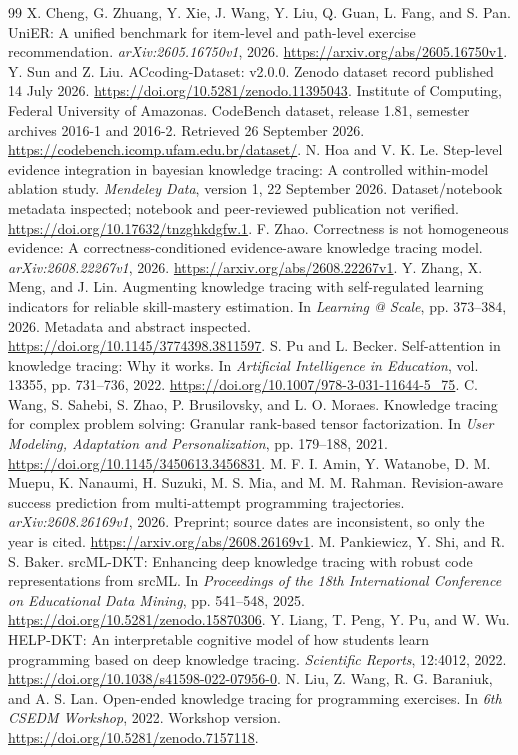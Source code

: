 \documentclass[11pt]{article}
\newcommand{\1}{\mathbb{I}}
\begin{document}
\begin{thebibliography}{99}
 X. Cheng, G. Zhuang, Y. Xie, J. Wang, Y. Liu, Q. Guan, L. Fang, and S. Pan. UniER: A unified benchmark for item-level and path-level exercise recommendation. \emph{arXiv:2605.16750v1}, 2026. \url{https://arxiv.org/abs/2605.16750v1}.
 Y. Sun and Z. Liu. ACcoding-Dataset: v2.0.0. Zenodo dataset record published 14 July 2026. \url{https://doi.org/10.5281/zenodo.11395043}.
 Institute of Computing, Federal University of Amazonas. CodeBench dataset, release 1.81, semester archives 2016-1 and 2016-2. Retrieved 26 September 2026. \url{https://codebench.icomp.ufam.edu.br/dataset/}.
 N. Hoa and V. K. Le. Step-level evidence integration in bayesian knowledge tracing: A controlled within-model ablation study. \emph{Mendeley Data}, version 1, 22 September 2026. Dataset/notebook metadata inspected; notebook and peer-reviewed publication not verified. \url{https://doi.org/10.17632/tnzghkdgfw.1}.
 F. Zhao. Correctness is not homogeneous evidence: A correctness-conditioned evidence-aware knowledge tracing model. \emph{arXiv:2608.22267v1}, 2026. \url{https://arxiv.org/abs/2608.22267v1}.
 Y. Zhang, X. Meng, and J. Lin. Augmenting knowledge tracing with self-regulated learning indicators for reliable skill-mastery estimation. In \emph{Learning @ Scale}, pp. 373--384, 2026. Metadata and abstract inspected. \url{https://doi.org/10.1145/3774398.3811597}.
 S. Pu and L. Becker. Self-attention in knowledge tracing: Why it works. In \emph{Artificial Intelligence in Education}, vol. 13355, pp. 731--736, 2022. \url{https://doi.org/10.1007/978-3-031-11644-5_75}.
 C. Wang, S. Sahebi, S. Zhao, P. Brusilovsky, and L. O. Moraes. Knowledge tracing for complex problem solving: Granular rank-based tensor factorization. In \emph{User Modeling, Adaptation and Personalization}, pp. 179--188, 2021. \url{https://doi.org/10.1145/3450613.3456831}.
 M. F. I. Amin, Y. Watanobe, D. M. Muepu, K. Nanaumi, H. Suzuki, M. S. Mia, and M. M. Rahman. Revision-aware success prediction from multi-attempt programming trajectories. \emph{arXiv:2608.26169v1}, 2026. Preprint; source dates are inconsistent, so only the year is cited. \url{https://arxiv.org/abs/2608.26169v1}.
 M. Pankiewicz, Y. Shi, and R. S. Baker. srcML-DKT: Enhancing deep knowledge tracing with robust code representations from srcML. In \emph{Proceedings of the 18th International Conference on Educational Data Mining}, pp. 541--548, 2025. \url{https://doi.org/10.5281/zenodo.15870306}.
 Y. Liang, T. Peng, Y. Pu, and W. Wu. HELP-DKT: An interpretable cognitive model of how students learn programming based on deep knowledge tracing. \emph{Scientific Reports}, 12:4012, 2022. \url{https://doi.org/10.1038/s41598-022-07956-0}.
 N. Liu, Z. Wang, R. G. Baraniuk, and A. S. Lan. Open-ended knowledge tracing for programming exercises. In \emph{6th CSEDM Workshop}, 2022. Workshop version. \url{https://doi.org/10.5281/zenodo.7157118}.
\end{thebibliography}
\end{document}
